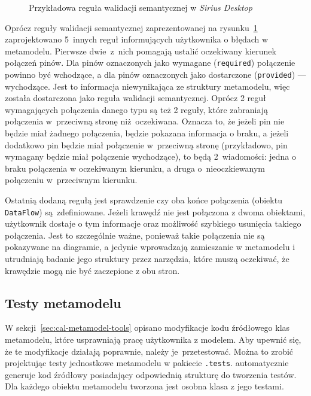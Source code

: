 \begin{figure}[!ht]
	\caption{Przykładowa reguła walidacji semantycznej w \emph{Sirius
    Desktop}}\label{rys:sirius-desktop-example-semantic-validation-rule}
  \medskip
\end{figure}

Oprócz reguły walidacji semantycznej zaprezentowanej na
rysunku~\ref{rys:sirius-desktop-example-semantic-validation-rule}
zaprojektowano 5~innych reguł informujących użytkownika o błędach w metamodelu.
Pierwsze dwie~z~nich pomagają ustalić oczekiwany kierunek połączeń pinów. Dla
pinów oznaczonych jako wymagane (\texttt{required}) połączenie powinno być
wchodzące, a dla pinów oznaczonych jako dostarczone (\texttt{provided}) ---
wychodzące. Jest to informacja niewynikająca ze struktury metamodelu, więc
została dostarczona jako reguła walidacji semantycznej. Oprócz 2 reguł
wymagających połączenia danego typu są też 2 reguły, które zabraniają
połączenia w~przeciwną stronę niż~oczekiwana. Oznacza to, że jeżeli pin nie
będzie miał żadnego połączenia, będzie pokazana informacja o braku, a jeżeli
dodatkowo pin będzie miał połączenie w~przeciwną stronę (przykładowo, pin
wymagany będzie miał połączenie wychodzące), to będą 2~wiadomości: jedna o
braku połączenia w oczekiwanym kierunku, a druga o~nieoczkiewanym połączeniu
w~przeciwnym kierunku.

Ostatnią dodaną regułą jest sprawdzenie czy oba końce połączenia (obiektu
\texttt{DataFlow}) są~zdefiniowane. Jeżeli krawędź nie jest połączona z dwoma
obiektami, użytkownik dostaje o tym informacje oraz możliwość szybkiego
usunięcia takiego połączenia. Jest to szczególnie ważne, ponieważ takie
połączenia nie są pokazywane na diagramie, a jedynie wprowadzają zamieszanie w
metamodelu i utrudniają badanie jego struktury przez narzędzia, które muszą
oczekiwać, że krawędzie mogą nie być zaczepione z obu stron.

\subsection{Testy metamodelu}\label{sec:testy-metamodelu}

W sekcji~\ref{sec:cal-metamodel-tools} opisano modyfikacje kodu źródłowego klas
metamodelu, które usprawniają pracę użytkownika z modelem. Aby upewnić się, że
te modyfikacje działają poprawnie, należy je~przetestować. Można to zrobić
projektując testy
jednostkowe metamodelu w pakiecie \texttt{.tests}. \SiriusDesktop{}
automatycznie generuje kod źródłowy posiadający odpowiednią strukturę do
tworzenia testów. Dla każdego obiektu metamodelu tworzona jest osobna klasa z
jego testami.

